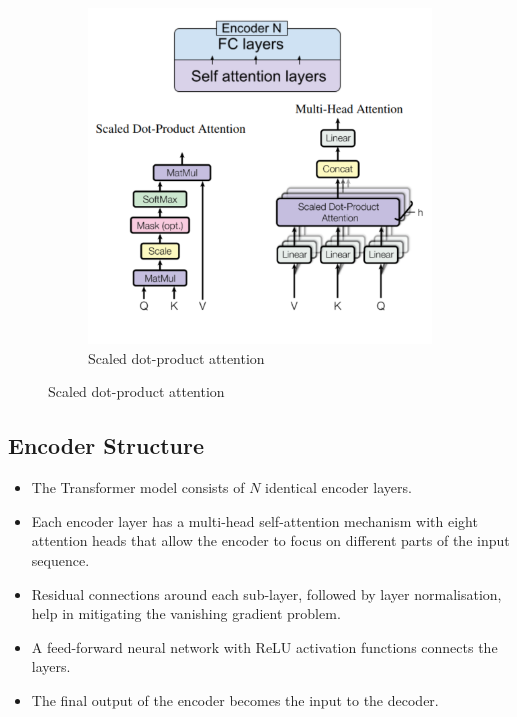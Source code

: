 \begin{figure}[H]
\begin{subfigure}[b]{0.5\textwidth}
        \includegraphics[width=\linewidth]{img/scaled_dot_prod_attn.png}
        \caption{Scaled dot-product attention}
        \label{fig:scaled_dot_prod}
    \end{subfigure}
\end{figure}

\subsection{Encoder Structure}
\begin{itemize}
    \item The Transformer model consists of \(N\) identical encoder layers.
    \item Each encoder layer has a multi-head self-attention mechanism with eight attention heads that allow the encoder to focus on different parts of the input sequence.
    \item Residual connections around each sub-layer, followed by layer normalisation, help in mitigating the vanishing gradient problem.
    \item A feed-forward neural network with ReLU activation functions connects the layers.
    \item The final output of the encoder becomes the input to the decoder.
\end{itemize}
